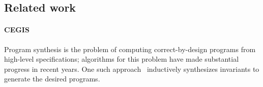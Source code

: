 \documentclass[runningheads,a4paper]{llncs}
\begin{document}


%





\subsection*{Related work}

\paragraph{CEGIS}

Program synthesis is the problem of computing correct-by-design programs
from high-level specifications; algorithms for this problem have made
substantial progress in recent years.  One such
approach~\cite{itzhaky2010simple} inductively synthesizes invariants to
generate the desired programs.
\end{document}
